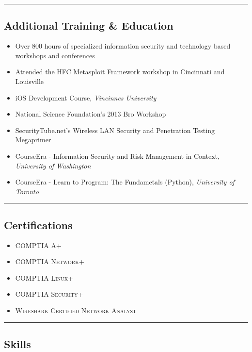 \documentclass[10pt,letterpaper]{article}
\begin{document}
\hrule
\vspace{-0.4em}
\subsection*{Additional Training \& Education}

\begin{itemize}
	\parskip=0.1em

	\item Over 800 hours of specialized information security and technology based workshops and conferences
	\item Attended the HFC Metasploit Framework workshop in Cincinnati and Louisville
	\item iOS Development Course, \textit{Vincinnes University}
	\item National Science Foundation's 2013 Bro Workshop
	\item SecurityTube.net's Wireless LAN Security and Penetration Testing Megaprimer
	\item CourseEra - Information Security and Risk Management in Context, \textit{University of Washington}
	\item CourseEra - Learn to Program: The Fundametals (Python), \textit{University of Toronto}
\end{itemize}

\hrule
\vspace{-0.4em}
\subsection*{Certifications}

\begin{itemize}
	\parskip=0.1em

	\item \textsc{COMPTIA A+}
	\item \textsc{COMPTIA Network+}
	\item \textsc{COMPTIA Linux+}
	\item \textsc{COMPTIA Security+}
	\item \textsc{Wireshark Certified Network Analyst}
\end{itemize}

\hrule
\vspace{-0.4em}
\subsection*{Skills}
\end{document}
